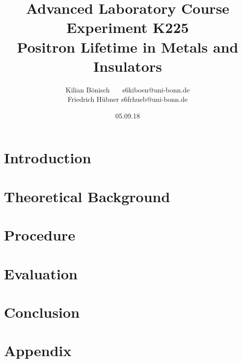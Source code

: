 \documentclass{article}
\begin{document}
\setlength{\parindent}{0em}   %
\title{Advanced Laboratory Course\\Experiment K225\\Positron Lifetime in Metals and Insulators}
\author{Kilian Bönisch \ \ \ \qquad s6kiboen@uni-bonn.de \\
  Friedrich Hübner \qquad s6frhueb@uni-bonn.de }
\date{05.09.18}

\maketitle
\thispagestyle{empty}

\newpage

\thispagestyle{empty}

\tableofcontents

\newpage

\section{Introduction}



\section{Theoretical Background}



\section{Procedure}



\section{Evaluation}



\newpage

\section{Conclusion}



\FloatBarrier

\newpage

\printbibliography

\newpage

\section{Appendix}

\end{document}
